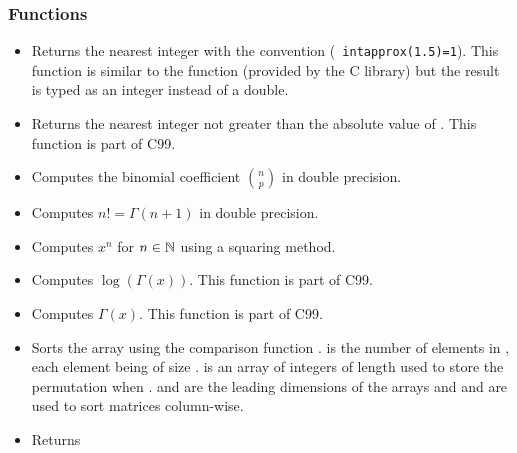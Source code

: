 \subsubsection{Functions}
\begin{itemize}
\item {}
  \sshortdescribe Returns the nearest integer with the convention ({\tt
  intapprox(1.5)=1}). This function is similar to the  function
  (provided by the C library) but the result is typed as an integer instead of a
  double.

\item {}
  \sshortdescribe Returns the nearest integer not greater than the absolute
  value of . This function is part of C99.

\item {}
  \sshortdescribe Computes the binomial coefficient $\binom{n}{p}$ in double
  precision.

\item {}
  \sshortdescribe Computes $n! = \Gamma(n+1)$ in double precision.

\item {}
  \sshortdescribe Computes $x^n$ for $n \in {\mathbb N}$ using a squaring method.

\item {}
  \sshortdescribe Computes $\log(\Gamma(x))$. This function is part of C99.

\item {}
  \sshortdescribe Computes $\Gamma(x)$. This function is part of C99.

\item {}
  \sshortdescribe Sorts the array  using the comparison function
  .  is the number of elements in , each element being of
  size .  is an array of integers of length  used to store
  the permutation when .  and  are the
  leading dimensions of the arrays  and  and are used to sort
  matrices column-wise. 

\item {}
  \sshortdescribe Returns 


\end{itemize}
